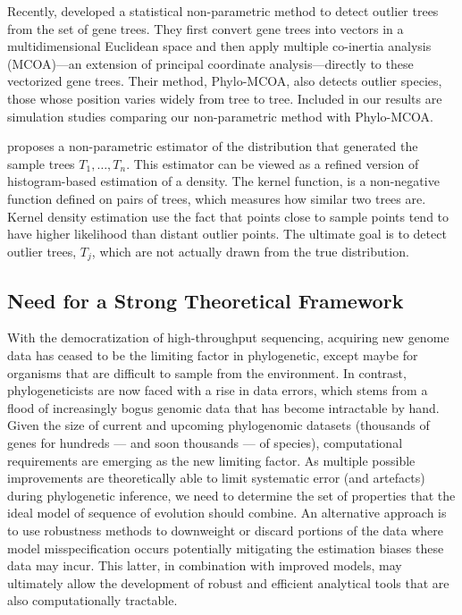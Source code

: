 Recently, \cite{de2012phylo} developed a statistical non-parametric method to detect outlier trees from the set of gene trees. They first convert gene trees into vectors in a multidimensional Euclidean space and then apply multiple co-inertia analysis (MCOA)—an extension of principal coordinate analysis—directly to these vectorized gene trees. Their method, Phylo-MCOA, also detects outlier species, those whose position varies widely from tree to tree. Included in our results are simulation studies comparing our non-parametric method with Phylo-MCOA.

\cite{weyenberg2014kdetrees}  proposes  a non-parametric estimator of the distribution that generated the sample trees $T_1,\ldots,T_n$.  This estimator can be viewed as a refined version of histogram-based estimation of a density. The kernel function, is a non-negative function defined on pairs of trees, which measures how similar two trees are. Kernel density estimation use the fact that points close to sample points tend to have higher likelihood than distant outlier points.  The ultimate goal is to detect outlier trees, $T_j$, which are not actually drawn from the true distribution.
%

\subsection{Need for a Strong Theoretical Framework} 

With the democratization of high-throughput sequencing, acquiring new genome data has ceased to be the limiting factor in phylogenetic, except maybe for organisms that are difficult to sample from the environment. In contrast, phylogeneticists are now faced with a rise in data errors, which stems from a flood of increasingly bogus genomic data that has become intractable by hand. Given the size of current and upcoming phylogenomic datasets (thousands of genes for hundreds —   and soon thousands —   of species), computational requirements are emerging as the new limiting factor. As multiple possible improvements are theoretically able to limit systematic error (and artefacts) during phylogenetic inference, we  need  to determine the set of properties that the ideal model of sequence of evolution should combine.  An alternative approach is to use robustness methods to downweight or discard portions of the data where model misspecification occurs potentially mitigating the estimation biases these data may incur. This latter, in combination with improved models, may ultimately allow the development of robust and efficient analytical
tools that are also computationally tractable. 